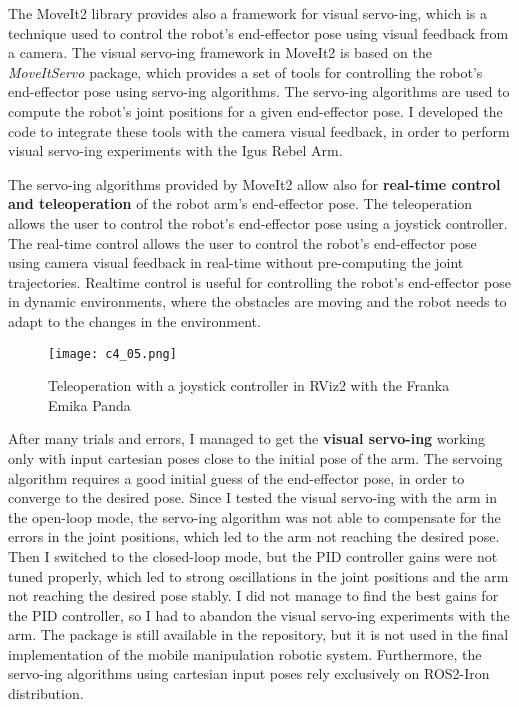 The MoveIt2 library provides also a framework for visual servo-ing, which is a technique used to control the robot's
end-effector pose using visual feedback from a camera. The visual servo-ing framework in MoveIt2 is based on the
\textit{MoveItServo} package, which provides a set of tools for controlling the robot's end-effector pose using
servo-ing algorithms. The servo-ing algorithms are used to compute the robot's joint positions for a given end-effector
pose. I developed the code to integrate these tools with the camera visual feedback, in order to perform visual servo-ing
experiments with the Igus Rebel Arm. 

The servo-ing algorithms provided by MoveIt2 allow also for \textbf{real-time control and teleoperation} of the robot arm's
end-effector pose. The teleoperation allows the user to control the robot's end-effector pose using a joystick controller.
The real-time control allows the user to control the robot's end-effector pose using camera visual feedback
in real-time without pre-computing the joint trajectories. Realtime control is useful for controlling the robot's
end-effector pose in dynamic environments, where the obstacles are moving and the robot needs to adapt to the changes
in the environment.

\begin{figure}[t]
    \centering
    \texttt{[image: c4\_05.png]}
    \caption{Teleoperation with a joystick controller in RViz2 with the Franka Emika Panda}
    \label{fig:teleop}
\end{figure}


After many trials and errors, I managed to get the \textbf{visual servo-ing} working
only with input cartesian poses close to the initial pose of the arm. The servoing algorithm requires
a good initial guess of the end-effector pose, in order to converge to the desired pose.
Since I tested the visual servo-ing with the arm in the open-loop mode, the servo-ing algorithm was not able to
compensate for the errors in the joint positions, which led to the arm not reaching the desired pose.
Then I switched to the closed-loop mode, but the PID controller gains were not tuned properly, which led to strong
oscillations in the joint positions and the arm not reaching the desired pose stably. I did not manage to find the
best gains for the PID controller, so I had to abandon the visual servo-ing experiments with the arm.
The package is still available in the repository, but it is not used in the final implementation
of the mobile manipulation robotic system. Furthermore, the servo-ing algorithms using cartesian input poses
rely exclusively on ROS2-Iron distribution.

